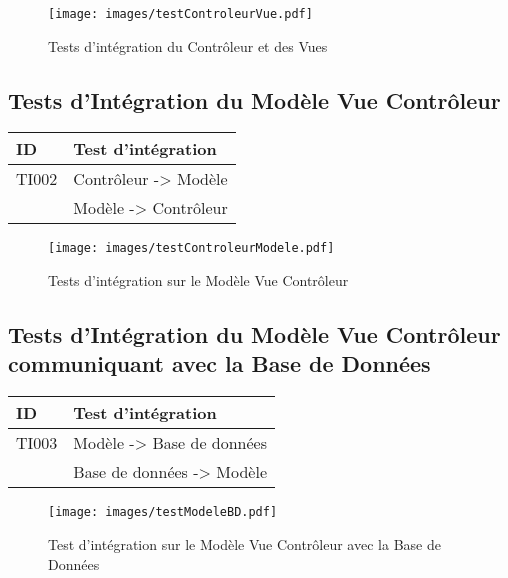   \begin{figure}[H]
  	\centering
  	\texttt{[image: images/testControleurVue.pdf]}
  	\caption{Tests d'intégration du Contrôleur et des Vues}
  	\label{testControleurEtVue}
  \end{figure}
  
  
 \subsection*{Tests d'Intégration du Modèle Vue Contrôleur}
  \begin{center}
    \begin{tabular}[h]{|p{}|p{}|}
	\hline
	ID & Test d'intégration \\\hline
        TI002 & Contrôleur -> Modèle \\ & Modèle -> Contrôleur \\\hline 
     \end{tabular}
  \end{center}
  
  \begin{figure}[H]
  	\centering
  	\texttt{[image: images/testControleurModele.pdf]}
  	\caption{Tests d'intégration sur le Modèle Vue Contrôleur}
  	\label{testModele}
  \end{figure}    
  
  
  \subsection*{Tests d'Intégration du Modèle Vue Contrôleur communiquant avec la Base de Données}
  \begin{center}
    \begin{tabular}[h]{|p{}|p{}|}
	\hline
		ID & Test d'intégration \\\hline
		TI003 & Modèle -> Base de données \\
         & Base de données -> Modèle \\\hline
     \end{tabular}
  \end{center}
  
  \begin{figure}[H]
  	\centering
  	\texttt{[image: images/testModeleBD.pdf]}
  	\caption{Test d'intégration sur le Modèle Vue Contrôleur avec la Base de Données}
  	\label{testBaseDeDonnees}
  \end{figure}
  
  
  
